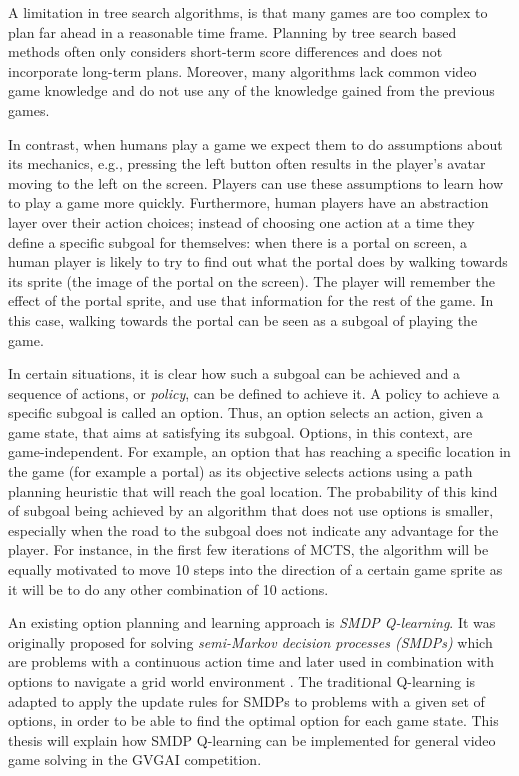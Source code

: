 A limitation in tree search algorithms, is that many games are too complex
to plan far ahead in a reasonable time frame. Planning by tree search based
methods often only considers short-term score differences and does not
incorporate long-term plans. Moreover, many algorithms lack common video game
knowledge and do not use any of the knowledge gained from the previous games.

In contrast, when humans play a game we expect them to do assumptions about its
mechanics, e.g., pressing the left button often results in the player's avatar
moving to the left on the screen. Players can use these assumptions to learn how
to play a game more quickly. Furthermore, human players have an abstraction
layer over their action choices; instead of choosing one action at a time they
define a specific subgoal for themselves: when there is a portal
on screen, a human player is likely to try to find out what the portal does by
walking towards its sprite (the image of the portal on the screen). The player
will remember the effect of the portal sprite, and use that information for the
rest of the game. In this case, walking towards the portal can be seen as a
subgoal of playing the game.

In certain situations, it is clear how such a subgoal can be achieved and a
sequence of actions, or \emph{policy}, can be defined to achieve it. A policy to
achieve a specific subgoal is called an option. Thus, an option selects an
action, given a game state, that aims at satisfying its subgoal. Options, in
this context, are game-independent. For example, an option that has reaching a
specific location in the game (for example a portal) as its objective selects
actions using a path planning heuristic that will reach the goal location. 
The probability of this kind of subgoal being achieved by an algorithm that
does not use options is smaller, especially when the road to the subgoal does
not indicate any advantage for the player. For instance, in the first few
iterations of MCTS, the algorithm will be equally motivated to move 10 steps
into the direction of a certain game sprite as it will be to do any other
combination of 10 actions. 

An existing option planning and learning approach is \emph{SMDP Q-learning}. It
was originally proposed for solving \emph{semi-Markov decision processes
(SMDPs)} which are problems with a continuous action time
\cite{duff1995reinforcement} and later used in combination with
options to navigate a grid world environment \cite{sutton1999between,
stolle2002learning}.  
The traditional Q-learning is adapted to apply the update rules for SMDPs to
problems with a given set of options, in order to be able to find the optimal
option for each game state. This thesis will explain how SMDP Q-learning can be
implemented for general video game solving in the GVGAI competition.  

